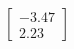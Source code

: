 \documentclass[preview]{standalone}
\begin{document}
\begin{align*}
\begin{bmatrix} -3.47 \\ 2.23 \end{bmatrix}
\end{align*}
\end{document}
